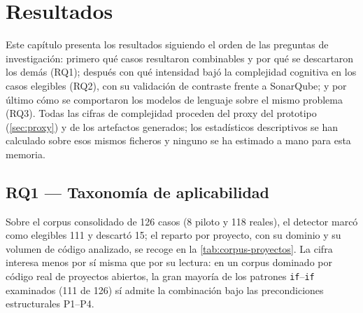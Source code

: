 
\chapter{Resultados}
\label{sec:resultados}

Este capítulo presenta los resultados siguiendo el orden de las preguntas de
investigación: primero qué casos resultaron combinables y por qué se
descartaron los demás (RQ1); después con qué intensidad bajó la complejidad
cognitiva en los casos elegibles (RQ2), con su validación de contraste frente
a SonarQube; y por último cómo se comportaron los modelos de lenguaje sobre el
mismo problema (RQ3). Todas las cifras de complejidad proceden del proxy del
prototipo (\autoref{sec:proxy}) y de los artefactos generados; los estadísticos descriptivos se han calculado sobre esos
mismos ficheros y ninguno se ha estimado a mano para esta memoria.

\section{RQ1 — Taxonomía de aplicabilidad}
\label{sec:resultados-rq1}
Sobre el corpus consolidado de 126 casos (8 piloto y 118 reales), el detector
marcó como elegibles 111 y descartó 15; el reparto por proyecto, con su dominio
y su volumen de código analizado, se recoge en la
\autoref{tab:corpus-proyectos}. La cifra interesa menos por sí misma
que por su lectura: en un corpus dominado por código real de proyectos
abiertos, la gran mayoría de los patrones \lstinline|if|--\lstinline|if|
examinados (111 de 126) sí admite la combinación bajo las precondiciones
estructurales P1--P4.

